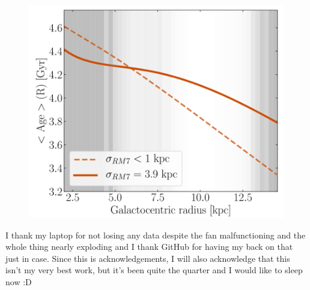 \documentclass[preprint2]{aastex631}
\begin{document}
\begin{figure}[htb]
    \centering
    \includegraphics[width=\columnwidth]{frankel2019_fig12.png}
    \caption{}
\end{figure}

\begin{acknowledgements}
    I thank my laptop for not losing any data despite the fan malfunctioning and the whole thing nearly exploding and I thank GitHub for having my back on that just in case. Since this is acknowledgements, I will also acknowledge that this isn't my very best work, but it's been quite the quarter and I would like to sleep now :D
\end{acknowledgements}


{}
\end{document}
